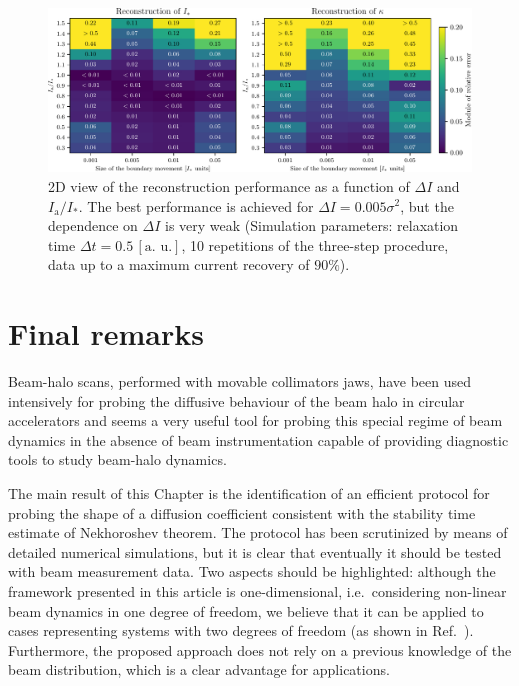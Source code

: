\begin{figure}[htp]
    \centering
    \includegraphics[width=\textwidth]{4_probing_the_diffusive_behavior/figs/final/MULTI_different_step_size.pdf}
    \caption{2D view of the reconstruction performance as a function of $\Delta I$ and $I_\mathrm{a}/I_\ast$. The  best performance is achieved for $\Delta I = 0.005 \sigma^2$, but the dependence on $\Delta I$ is very weak (Simulation parameters: relaxation time $\Delta t=0.5 \, [\text{a. u.}]$, 10 repetitions of the three-step procedure, data up to a maximum current recovery of $90\%$).}
    \label{fig:different_movement_module}
\end{figure}


\section{Final remarks}
\label{sec:conclusions}


Beam-halo scans, performed with movable collimators jaws, have been used intensively for probing the diffusive behaviour of the beam halo in circular accelerators and seems a very useful tool for probing this special regime of beam dynamics in the absence of beam instrumentation capable of providing diagnostic tools to study beam-halo dynamics.

{The main result of this Chapter} is the identification of an efficient protocol for probing the shape of {a diffusion coefficient consistent with the stability time estimate of Nekhoroshev theorem}. The protocol has been scrutinized by means of detailed numerical simulations, {but} it is clear that eventually it should be tested with beam measurement data. Two aspects should be highlighted: although the framework presented in this article is one-dimensional, i.e.\ considering non-linear beam dynamics in one degree of freedom, we believe that it can be applied to cases representing systems with two degrees of freedom (as shown in Ref.~\cite{bazzani2020diffusion}). Furthermore, the proposed approach does not rely on a previous knowledge of the beam distribution, which is a clear advantage for applications. 
 
